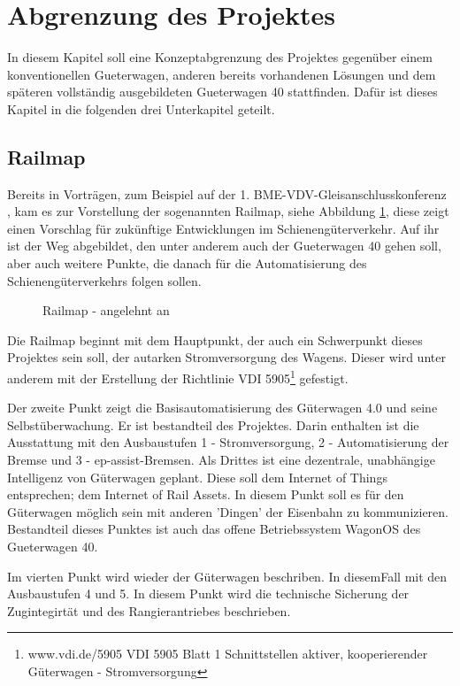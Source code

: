 \section{Abgrenzung des Projektes}\label{sec:Abgrenzung}
In diesem Kapitel soll eine Konzeptabgrenzung des Projektes gegenüber einem konventionellen \gls{Gueterwagen}, anderen bereits vorhandenen Lösungen und dem späteren vollständig ausgebildeten \gls{Gueterwagen 40} stattfinden. Dafür ist dieses Kapitel in die folgenden drei Unterkapitel geteilt.

\subsection{Railmap}
Bereits in Vorträgen, zum Beispiel auf der 1. BME-VDV-Gleisanschlusskonferenz \cite{GAK}, kam es zur Vorstellung der sogenannten Railmap, siehe Abbildung \ref{fig:Railmap}, diese zeigt einen Vorschlag für zukünftige Entwicklungen im Schienengüterverkehr. Auf ihr ist der Weg abgebildet, den unter anderem auch der \gls{Gueterwagen 40}  gehen soll, aber auch weitere Punkte, die danach für die Automatisierung des Schienengüterverkehrs folgen sollen.\par
\begin{figure}[hbp]
    \centering
    
    \caption{Railmap - angelehnt an \cite{GAK}}
    \label{fig:Railmap}
\end{figure}
Die Railmap beginnt mit dem Hauptpunkt, der auch ein Schwerpunkt dieses Projektes sein soll, der autarken Stromversorgung des Wagens. Dieser wird unter anderem mit der Erstellung der Richtlinie VDI 5905\footnote{www.vdi.de/5905 VDI 5905 Blatt 1 Schnittstellen aktiver, kooperierender Güterwagen - Stromversorgung} gefestigt.\par
Der zweite Punkt zeigt die Basisautomatisierung des Güterwagen 4.0 und seine Selbstüberwachung. Er ist bestandteil des Projektes. Darin enthalten ist die Ausstattung mit den Ausbaustufen 1 - Stromversorgung, 2 - Automatisierung der Bremse und 3 - \gls{ep-assist-Bremsen}.
Als Drittes ist eine dezentrale, unabhängige Intelligenz von Güterwagen geplant. Diese soll dem Internet of Things entsprechen; dem Internet of Rail Assets. In diesem Punkt soll es für den Güterwagen möglich sein mit anderen 'Dingen' der Eisenbahn zu kommunizieren. Bestandteil dieses Punktes  ist auch das offene Betriebssystem \gls{WagonOS} des \gls{Gueterwagen 40}.\par
Im vierten Punkt wird wieder der Güterwagen beschriben. In diesemFall mit den Ausbaustufen 4 und 5. In diesem Punkt wird die technische Sicherung der Zugintegirtät und des Rangierantriebes beschrieben.\par
